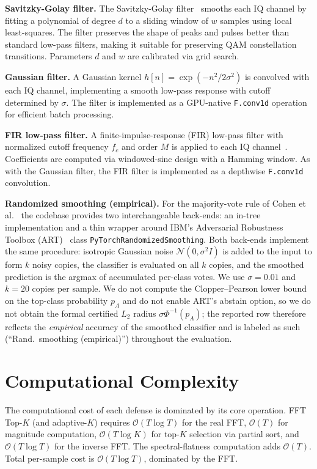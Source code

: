 \textbf{Savitzky-Golay filter.}
The Savitzky-Golay filter~\cite{savitzky1964smoothing} smooths each IQ
channel by fitting a polynomial of degree $d$ to a sliding window of $w$
samples using local least-squares. The filter preserves the shape of peaks
and pulses better than standard low-pass filters, making it suitable for
preserving QAM constellation transitions. Parameters $d$ and $w$ are
calibrated via grid search.

\textbf{Gaussian filter.}
A Gaussian kernel $h[n] = \exp(-n^2 / 2\sigma^2)$ is convolved with each
IQ channel, implementing a smooth low-pass response with cutoff determined
by $\sigma$. The filter is implemented as a GPU-native \texttt{F.conv1d}
operation for efficient batch processing.

\textbf{FIR low-pass filter.}
A finite-impulse-response (FIR) low-pass filter with normalized cutoff
frequency $f_c$ and order $M$ is applied to each IQ
channel~\cite{proakis2006digital}. Coefficients are computed via
windowed-sinc design with a Hamming window. As with the Gaussian filter,
the FIR filter is implemented as a depthwise \texttt{F.conv1d} convolution.

\textbf{Randomized smoothing (empirical).}
For the majority-vote rule of Cohen et
al.~\cite{cohen2019certified} the codebase provides two interchangeable
back-ends: an in-tree implementation and a thin wrapper around IBM's
Adversarial Robustness Toolbox
(ART)~\cite{art2018} class
\texttt{PyTorchRandomizedSmoothing}. Both back-ends implement the
same procedure: isotropic Gaussian noise
$\mathcal{N}(0, \sigma^2 I)$ is added to the input to form $k$ noisy
copies, the classifier is evaluated on all $k$ copies, and the
smoothed prediction is the argmax of accumulated per-class votes. We
use $\sigma = 0.01$ and $k = 20$ copies per sample. We do not compute
the Clopper--Pearson lower bound on the top-class probability $p_A$
and do not enable ART's abstain option, so we do not obtain the
formal certified $L_2$ radius $\sigma \Phi^{-1}(p_A)$; the reported
row therefore reflects the \emph{empirical} accuracy of the smoothed
classifier and is labeled as such (``Rand.\ smoothing (empirical)'')
throughout the evaluation.

\section{Computational Complexity}
\label{sec:complexity}

The computational cost of each defense is dominated by its core operation.
FFT Top-$K$ (and adaptive-$K$) requires $\mathcal{O}(T \log T)$ for the real
FFT, $\mathcal{O}(T)$ for magnitude computation, $\mathcal{O}(T \log K)$ for
top-$K$ selection via partial sort, and $\mathcal{O}(T \log T)$ for the
inverse FFT. The spectral-flatness computation adds $\mathcal{O}(T)$. Total
per-sample cost is $\mathcal{O}(T \log T)$, dominated by the FFT.

